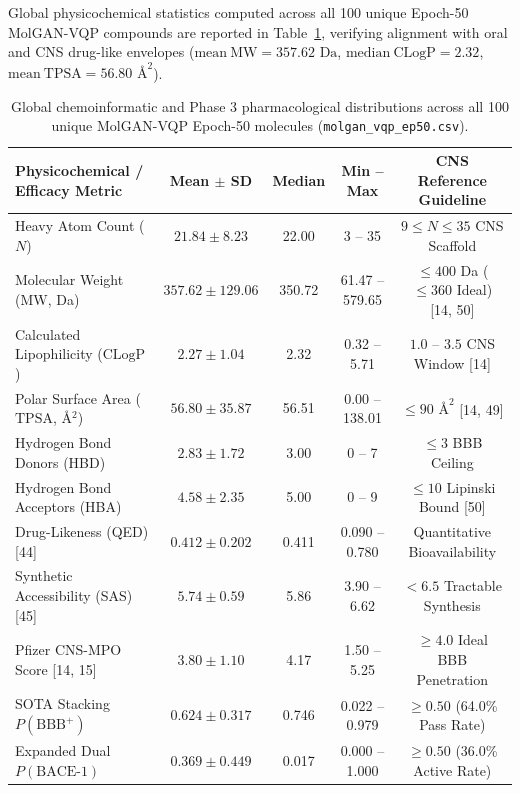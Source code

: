 \documentclass[10pt,a4paper]{article}
\begin{document}
Global physicochemical statistics computed across all 100 unique Epoch-50 MolGAN-VQP compounds are reported in Table~\ref{tab:global_stats}, verifying alignment with oral and CNS drug-like envelopes ($\mathrm{mean\ MW} = 357.62\text{ Da}$, $\mathrm{median\ CLogP} = 2.32$, $\mathrm{mean\ TPSA} = 56.80\text{ \AA}^2$).

\begin{table}[!htbp]
\centering
\caption{Global chemoinformatic and Phase 3 pharmacological distributions across all 100 unique MolGAN-VQP Epoch-50 molecules (\texttt{molgan\_vqp\_ep50.csv}).}
\label{tab:global_stats}
\small
\begin{tabular}{@{}lcccc@{}}
\toprule
\textbf{Physicochemical / Efficacy Metric} & \textbf{Mean $\pm$ SD} & \textbf{Median} & \textbf{Min -- Max} & \textbf{CNS Reference Guideline} \\
\midrule
Heavy Atom Count ($N$) & $21.84 \pm 8.23$ & 22.00 & 3 -- 35 & $9 \le N \le 35$ CNS Scaffold \\
Molecular Weight (MW, Da) & $357.62 \pm 129.06$ & 350.72 & 61.47 -- 579.65 & $\le 400$ Da ($\le 360$ Ideal) [14, 50] \\
Calculated Lipophilicity ($\text{CLogP}$) & $2.27 \pm 1.04$ & 2.32 & 0.32 -- 5.71 & $1.0$ -- $3.5$ CNS Window [14] \\
Polar Surface Area ($\text{TPSA}$, \AA$^2$) & $56.80 \pm 35.87$ & 56.51 & 0.00 -- 138.01 & $\le 90\text{ \AA}^2$ [14, 49] \\
Hydrogen Bond Donors (HBD) & $2.83 \pm 1.72$ & 3.00 & 0 -- 7 & $\le 3$ BBB Ceiling \\
Hydrogen Bond Acceptors (HBA) & $4.58 \pm 2.35$ & 5.00 & 0 -- 9 & $\le 10$ Lipinski Bound [50] \\
Drug-Likeness (QED) [44] & $0.412 \pm 0.202$ & 0.411 & 0.090 -- 0.780 & Quantitative Bioavailability \\
Synthetic Accessibility (SAS) [45] & $5.74 \pm 0.59$ & 5.86 & 3.90 -- 6.62 & $< 6.5$ Tractable Synthesis \\
Pfizer CNS-MPO Score [14, 15] & $3.80 \pm 1.10$ & 4.17 & 1.50 -- 5.25 & $\ge 4.0$ Ideal BBB Penetration \\
SOTA Stacking $P(\text{BBB}^+)$ & $0.624 \pm 0.317$ & 0.746 & 0.022 -- 0.979 & $\ge 0.50$ (64.0\% Pass Rate) \\
Expanded Dual $P(\text{BACE-1})$ & $0.369 \pm 0.449$ & 0.017 & 0.000 -- 1.000 & $\ge 0.50$ (36.0\% Active Rate) \\
\bottomrule
\end{tabular}
\end{table}
\end{document}
